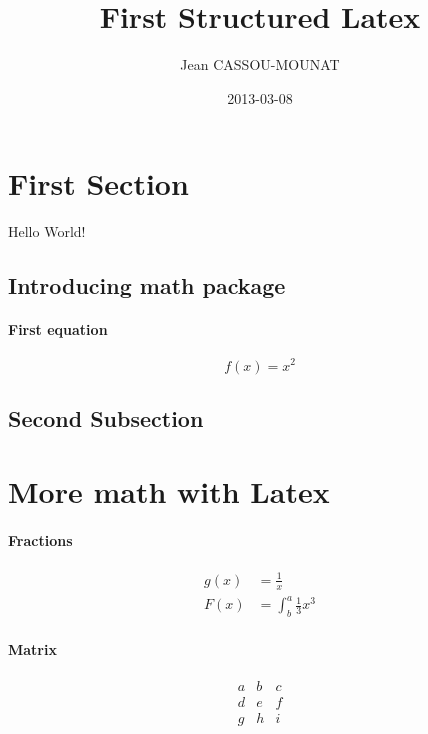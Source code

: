\documentclass{article}
\title{First Structured Latex}
\date{2013-03-08}
\author{Jean CASSOU-MOUNAT}
\begin{document}
\maketitle
{}
\newpage
{}

\section{First Section}

Hello World!

\subsection{Introducing math package}

\paragraph{First equation}

\begin{equation*}
  f(x) = x^2
\end{equation*}

\subsection{Second Subsection}

\section{More math with Latex}

\paragraph{Fractions}

\begin{align*}
  g(x) &= \frac{1}{x}\\
  F(x) &= \int^a_b \frac{1}{3}x^3
\end{align*}

\paragraph{Matrix}

\[
 \begin{matrix}
  a & b & c \\
  d & e & f \\
  g & h & i
 \end{matrix}
\]
\end{document}
